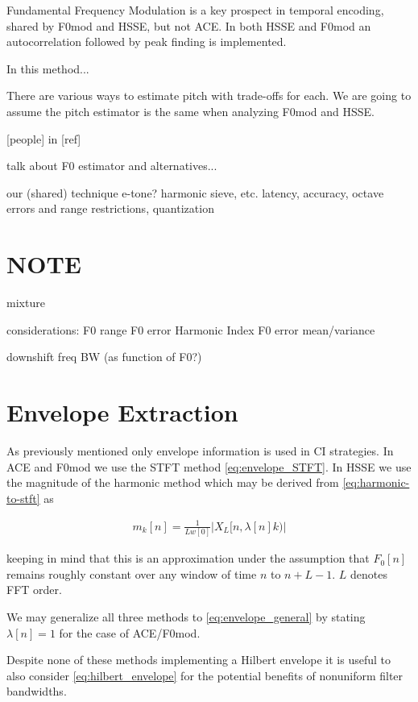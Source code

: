 \documentclass [11pt, proquest] {uwthesis}[2015/03/03]
\begin{document}
Fundamental Frequency Modulation is a key prospect in temporal encoding, shared by F0mod and HSSE, but not ACE.  In both HSSE and F0mod an autocorrelation followed by peak finding is implemented.

In this method...

There are various ways to estimate pitch with trade-offs for each.  We are going to assume the pitch estimator is the same when analyzing F0mod and HSSE.


 [people] in [ref] 

talk about F0 estimator and alternatives...

    our (shared) technique
    e-tone? harmonic sieve, etc.
    latency, accuracy, octave errors and range restrictions,
    quantization

\section{NOTE}

mixture %

considerations:
F0 range
F0 error
Harmonic Index
F0 error mean/variance

downshift freq
BW (as function of F0?)


\section{Envelope Extraction}

As previously mentioned only envelope information is used in CI strategies.  In ACE and F0mod we use the STFT method \ref{eq:envelope_STFT}.  In HSSE we use the magnitude of the harmonic method which may be derived from \ref{eq:harmonic-to-stft} as 

\begin{align}
\label{eq:envelope_general}
m_k[n] = \frac{1}{Lw[0]} \vert X_L[n, \lambda[n]k) \vert
\end{align}

keeping in mind that this is an approximation under the assumption that $F_0[n]$ remains roughly constant over any window of time $n$ to $n + L - 1$.  $L$ denotes FFT order.

We may generalize all three methods to \ref{eq:envelope_general} by stating $\lambda[n] = 1$ for the case of ACE/F0mod.

Despite none of these methods implementing a Hilbert envelope it is useful to also consider \ref{eq:hilbert_envelope} for the potential benefits of nonuniform filter bandwidths.
\end{document}
